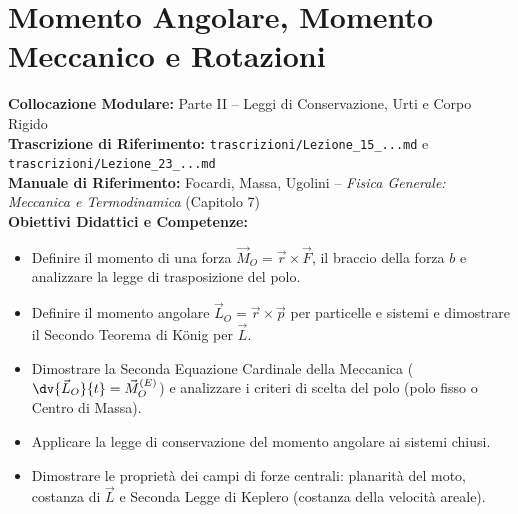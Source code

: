 \chapter{Momento Angolare, Momento Meccanico e Rotazioni}
\label{chap:momento_angolare_rotazione}

\begin{tcolorbox}[enhanced, breakable, colback=navyblue!4!white, colframe=navyblue!80!black,
    coltitle=white, fonttitle=\bfseries\sffamily, title={Quadro Sinottico del Capitolo 07 (Corrispondenza: Lezione 15 e parte di 23)},
    sharp corners, rounded corners=south, boxrule=1pt]
\textbf{Collocazione Modulare:} Parte II -- Leggi di Conservazione, Urti e Corpo Rigido\\
\textbf{Trascrizione di Riferimento:} \texttt{trascrizioni/Lezione\_15\_...md} e \texttt{trascrizioni/Lezione\_23\_...md}\\
\textbf{Manuale di Riferimento:} Focardi, Massa, Ugolini -- \emph{Fisica Generale: Meccanica e Termodinamica} (Capitolo 7)\\
\textbf{Obiettivi Didattici e Competenze:}\par
\begin{itemize}
    \item Definire il momento di una forza $\vec{M}_O = \vec{r}\times\vec{F}$, il braccio della forza $b$ e analizzare la legge di trasposizione del polo.
    \item Definire il momento angolare $\vec{L}_O = \vec{r}\times\vec{p}$ per particelle e sistemi e dimostrare il Secondo Teorema di König per $\vec{L}$.
    \item Dimostrare la Seconda Equazione Cardinale della Meccanica ($\dv{\vec{L}_O}{t} = \vec{M}_O^{(E)}$) e analizzare i criteri di scelta del polo (polo fisso o Centro di Massa).
    \item Applicare la legge di conservazione del momento angolare ai sistemi chiusi.
    \item Dimostrare le proprietà dei campi di forze centrali: planarità del moto, costanza di $\vec{L}$ e Seconda Legge di Keplero (costanza della velocità areale).
\end{itemize}
\end{tcolorbox}

\vspace{0.5em}

